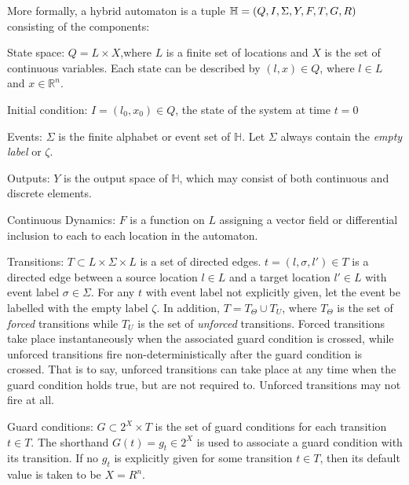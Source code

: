 More formally, a hybrid automaton is a tuple $\mathbb{H} = \\(Q, I, \Sigma, Y, F, T, G, R)$ consisting of the components:

State space: $Q = L \times X$,where $L$ is a finite set of locations and $X$ is the set of continuous variables. Each state can be described by $(l,x) \in Q$, where $l \in L$ and $x \in \mathbb{R}^n$.

Initial condition: $I = (l_0,x_0) \in Q$, the state of the system at time $t = 0$

Events: $\Sigma$ is the finite alphabet or event set of $\mathbb{H}$. Let $\Sigma$ always contain the \textit{empty label} or $\zeta$.

Outputs: $Y$ is the output space of $\mathbb{H}$, which may consist of both continuous and discrete elements.

Continuous Dynamics: $F$ is a function on $L$ assigning a vector field or differential inclusion to each to each location in the automaton.


Transitions: $T \subset L \times \Sigma \times L$ is a set of directed edges. $t = (l,\sigma, l') \in T$ is a directed edge between a source location $l \in L$ and a target location $l' \in L$ with event label $\sigma \in \Sigma$. For any $t$ with event label not explicitly given, let the event be labelled with the empty label $\zeta$. In addition, $T = T_{\Theta} \cup T_{U}$, where $T_{\Theta}$ is the set of \textit{forced} transitions while $T_{U}$ is the set of \textit{unforced} transitions. Forced transitions take place instantaneously when the associated guard condition is crossed, while unforced transitions fire non-deterministically after the guard condition is crossed. That is to say, unforced transitions can take place at any time when the guard condition holds true, but are not required to. Unforced transitions may not fire at all.

% 
Guard conditions: $G \subset 2^X \times T$ is the set of guard conditions for each transition $t \in T$. The shorthand $G(t) = g_t \in 2^X$ is used to associate a guard condition with its transition. If no $g_t$ is explicitly given for some transition $t \in T$, then its default value is taken to be $X = R^n$. %

